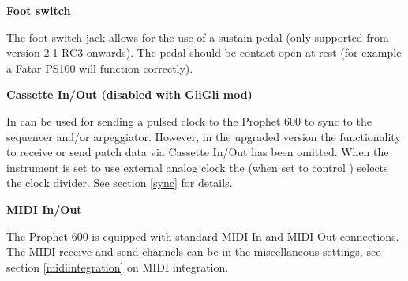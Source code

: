 \textbf{Foot switch}

The foot switch jack allows for the use of a sustain pedal (only supported from version 2.1 RC3 onwards). The pedal should be contact open at rest (for example a Fatar PS100 will function correctly).

\textbf{Cassette In/Out (disabled with GliGli mod)}

\cassettein In can be used for sending a pulsed clock to the Prophet 600 to sync to the sequencer and/or arpeggiator. However, in the upgraded version the functionality to receive or send patch data via Cassette In/Out has been omitted. When the instrument is set to use external analog clock the \datadial (when set to control \clock) selects the clock divider. See section \ref{sync} for details.

\textbf{MIDI In/Out}

The Prophet 600 is equipped with standard MIDI In and MIDI Out connections. The MIDI receive and send channels can be in the miscellaneous settings, see section \ref{midiintegration} on MIDI integration.  

